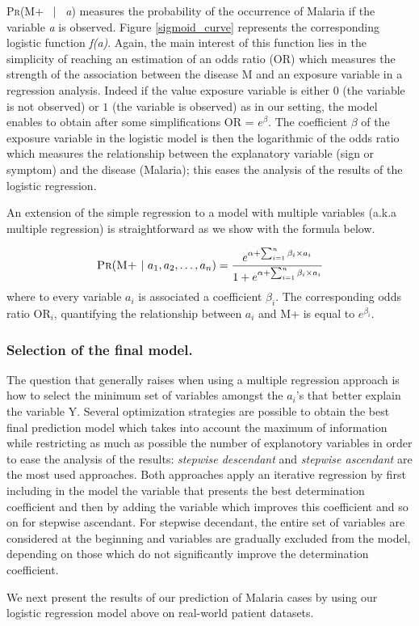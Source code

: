 \textsc{Pr}(\textsc{M+} ~$|$~ \emph{a}) measures the probability of the occurrence of Malaria if the variable \emph{a} is observed.
Figure \ref{sigmoid_curve} represents the corresponding logistic function \emph{f(a)}. Again, the main interest of this function
lies in the simplicity of reaching an estimation of an odds ratio (OR) which measures the strength of the association between the 
disease \textsc{M} and an exposure variable in a regression analysis. Indeed if the value exposure variable is either $0$ (the variable is not observed)
or $1$ (the variable is observed) as in our setting, the model enables to obtain after some simplifications OR = $e^{\beta}$. The coefficient $\beta$ 
of the exposure variable in the logistic model is then the logarithmic of the odds ratio which measures the relationship between the explanatory variable 
(sign or symptom) and the disease (Malaria); this eases the analysis of the results of the logistic regression. 

An extension of the simple regression to a model with multiple variables (a.k.a multiple regression) is straightforward as we show with the formula below.

\begin{equation}
\textsc{Pr}(\textsc{M+} ~|~ \emph{$a_1$},\emph{$a_2$}, \ldots, \emph{$a_n$}) = \frac{e^{\alpha + \sum_{i=1}^{n} \beta_i \times \emph{$a_i$} }}{1 + e^{\alpha + \sum_{i=1}^{n} \beta_i \times \emph{$a_i$} }}
\label{multiple_regression}
\end{equation} 
where to every variable \emph{$a_i$} is associated a coefficient $\beta_i$. The corresponding odds ratio OR$_i$, quantifying the relationship between \emph{$a_i$} and \textsc{M+} is equal to $e^{\beta_i}$.

\subsubsection{Selection of the final model.}
The question that generally raises when using a multiple regression approach is how to select the minimum set of variables amongst the \emph{$a_i$}'s that better explain the variable \textsc{Y}.  
Several optimization strategies are possible to obtain the best final prediction model which takes into account the maximum of information
while restricting as much as possible the number of explanotory variables in order to ease the analysis of the results:
\emph{stepwise descendant} and \emph{stepwise ascendant} are the most used approaches. Both approaches apply an iterative 
regression by first including in the model the variable that presents the best determination coefficient and then by adding the
variable which improves this coefficient and so on for stepwise ascendant. For stepwise decendant, the entire set of variables are considered at the beginning and variables are gradually excluded
from the model, depending on those which do not significantly improve the determination coefficient.

We next present the results of our prediction of Malaria cases by using our logistic regression model above on real-world patient datasets.    

